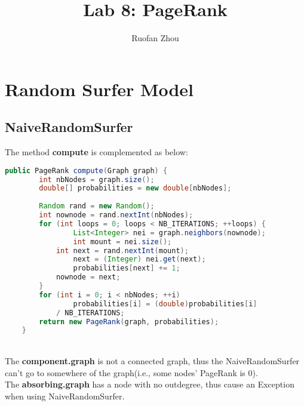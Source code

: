\documentclass[11pt]{article} %
\title{Lab 8: PageRank}
\author{Ruofan Zhou}
\begin{document}
\maketitle

\section{Random Surfer Model}
\subsection{NaiveRandomSurfer}
The method \textbf{compute} is complemented as below:\\
\begin{lstlisting}[language=JAVA]
public PageRank compute(Graph graph) {
        int nbNodes = graph.size();
        double[] probabilities = new double[nbNodes];
        
        Random rand = new Random();
        int nownode = rand.nextInt(nbNodes);
        for (int loops = 0; loops < NB_ITERATIONS; ++loops) {
        		List<Integer> nei = graph.neighbors(nownode);
        		int mount = nei.size();
      	  	int next = rand.nextInt(mount);
        		next = (Integer) nei.get(next);
        		probabilities[next] += 1;
   	     	nownode = next;
        }
        for (int i = 0; i < nbNodes; ++i)
        		probabilities[i] = (double)probabilities[i]
			/ NB_ITERATIONS;
        return new PageRank(graph, probabilities);
    }
\end{lstlisting}
\\
The \textbf{component.graph} is not a connected graph, thus the NaiveRandomSurfer can't go to somewhere of the graph(i.e., some nodes' PageRank is 0).\\
The \textbf{absorbing.graph} has a node with no outdegree, thus cause an Exception when using NaiveRandomSurfer.\\
\end{document}
